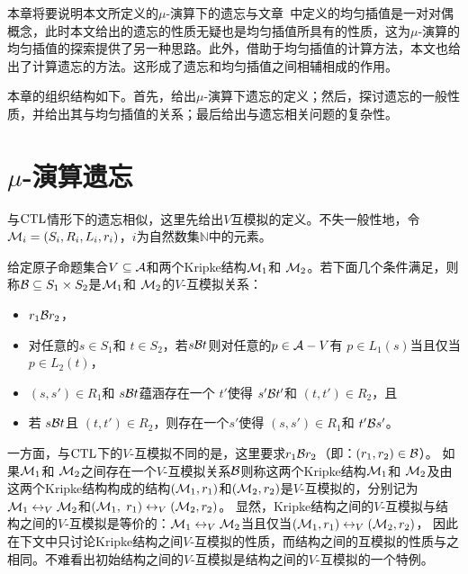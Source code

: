 本章将要说明本文所定义的$\mu$-演算下的遗忘与文章~\cite{d2006modal}中定义的均匀插值是一对对偶概念，此时本文给出的遗忘的性质无疑也是均匀插值所具有的性质，这为$\mu$-演算的均匀插值的探索提供了另一种思路。此外，借助于均匀插值的计算方法，本文也给出了计算遗忘的方法。这形成了遗忘和均匀插值之间相辅相成的作用。

本章的组织结构如下。首先，给出$\mu$-演算下遗忘的定义；然后，探讨遗忘的一般性质，并给出其与均匀插值的关系；最后给出与遗忘相关问题的复杂性。

\section{$\mu$-演算遗忘}\label{sec:chapter06-system-model}
与$\textrm{CTL}$情形下的遗忘相似，这里先给出$V$互模拟的定义。不失一般性地，令${\cal M}_i = (S_i, R_i, L_i, r_i)$，$i$为自然数集$\mathbb{N}$中的元素。
\begin{definition}[$V$-互模拟]\label{def:VB}
	给定原子命题集合$V \subseteq {\cal A}$和两个Kripke结构${\cal M}_1$和 ${\cal M}_2$。若下面几个条件满足，则称${\cal B}\subseteq S_1 \times S_2$是${\cal M}_1$和 ${\cal M}_2$的$V$-互模拟关系：
	\begin{itemize}
		\item $r_1 {\cal B} r_2$，
		\item 对任意的$s\in S_1$和 $t\in S_2$，若$s {\cal B} t$则对任意的$p \in {\cal A}- V$有 $p \in L_1(s)$当且仅当 $p \in L_2(t)$，
		\item $(s, s')\in R_1$和 $s {\cal B} t$蕴涵存在一个 $t'$使得 $s' {\cal B} t'$和 $(t, t')\in R_2$，且
		\item 若 $s {\cal B} t$且 $(t, t')\in R_2$，则存在一个$s'$使得 $(s, s')\in R_1$和 $t' {\cal B} s'$。
	\end{itemize}
\end{definition}

一方面，与$\textrm{CTL}$下的$V$-互模拟不同的是，这里要求$r_1 {\cal B} r_2$（即：$(r_1,r_2)\in {\cal B}$）。
如果${\cal M}_1$和 ${\cal M}_2$之间存在一个$V$-互模拟关系${\cal B}$则称这两个Kripke结构${\cal M}_1$和 ${\cal M}_2$及由这两个Kripke结构构成的结构$({\cal M}_1,r_1)$和$({\cal M}_2,r_2)$是$V$-互模拟的，分别记为${\cal M}_1 \leftrightarrow_V {\cal M}_2$和$({\cal M}_1,$ $r_1) \leftrightarrow_V ({\cal M}_2,r_2)$。
显然，Kripke结构之间的$V$-互模拟与结构之间的$V$-互模拟是等价的：${\cal M}_1 \leftrightarrow_V {\cal M}_2$当且仅当$({\cal M}_1,r_1) \leftrightarrow_V ({\cal M}_2,r_2)$， 因此在下文中只讨论Kripke结构之间$V$-互模拟的性质，而结构之间的互模拟的性质与之相同。不难看出初始结构之间的$V$-互模拟是结构之间的$V$-互模拟的一个特例。


